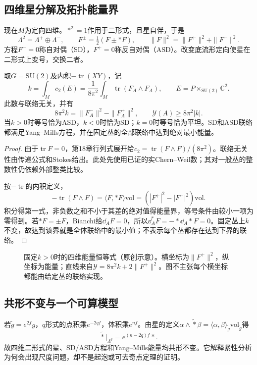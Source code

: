 \subsection{四维星分解及拓扑能量界}
现在$M$为定向四维。$*^2=1$作用于二形式，且星自伴，于是
\[
 \Lambda^2=\Lambda^+\oplus\Lambda^-,\qquad
 F^\pm=\tfrac12(F\pm *F),\qquad
 \|F\|^2=\|F^+\|^2+\|F^-\|^2.
\]
方程$F^-=0$称自对偶（SD），$F^+=0$称反自对偶（ASD）。改变底流形定向使星在二形式上变号，交换二者。

\begin{theorem}\label{thm:ym-bound}
取$G=\mathrm{SU}(2)$及内积$-\operatorname{tr}(XY)$，记
\[
 k=\int_M c_2(E)=\frac1{8\pi^2}\int_M\operatorname{tr}(F_A\wedge F_A),
 \qquad E=P\times_{\mathrm{SU}(2)}\mathbb C^2.
\]
此数与联络无关，并有
\begin{equation}\label{eq:ym-bound}
 8\pi^2k=\|F_A^-\|^2-\|F_A^+\|^2,\qquad
 \mathcal Y(A)\geq8\pi^2|k|.
\end{equation}
当$k>0$时等号恰为ASD，$k<0$时恰为SD；$k=0$时等号恰为平坦。SD和ASD联络都满足Yang--Mills方程，并在固定丛的全部联络中达到绝对最小能量。
\end{theorem}
\begin{proof}
由于$\operatorname{tr}F=0$，第18章行列式展开给$c_2=\operatorname{tr}(F\wedge F)/(8\pi^2)$。联络无关性由传递公式和Stokes给出。此处先使用已证的实Chern--Weil数；其对一般丛的整数性仍依赖外部整类比较。

按$-\operatorname{tr}$的内积定义，
\[
 -\operatorname{tr}(F\wedge F)=\langle F,*F\rangle\mathrm{vol}
 =(|F^+|^2-|F^-|^2)\mathrm{vol}.
\]
积分得第一式，非负数之和不小于其差的绝对值得能量界，等号条件由较小一项为零得到。若$*F=\pm F$，Bianchi给$\dd_AF=0$，所以$\dd_A^*F=-*\dd_A*F=0$。固定丛上$k$不变，故达到该界就是全体联络中的最小值；不表示每个丛都存在达到下界的联络。
\end{proof}

\begin{figure}[htbp]
 \centering
 \caption{固定$k>0$时的四维能量恒等式（原创示意）。横坐标为$\|F^+\|^2$，纵坐标为能量；直线来自$\mathcal Y=8\pi^2k+2\|F^+\|^2$。图不主张每个横坐标都能由给定丛的联络实现。}
\end{figure}

\subsection{共形不变与一个可算模型}
若$\widetilde g=e^{2f}g$，$q$形式的点积乘$e^{-2qf}$，体积乘$e^{nf}$。由星的定义$\alpha\wedge\widetilde *\beta=\langle\alpha,\beta\rangle_{\widetilde g}\mathrm{vol}_{\widetilde g}$得
\[
 \widetilde *|_{\Lambda^q}=e^{(n-2q)f}*.
\]
故四维二形式的星、SD/ASD方程和Yang--Mills能量均共形不变。它解释紧性分析为何会出现尺度问题，却不是起泡或可去奇点定理的证明。

